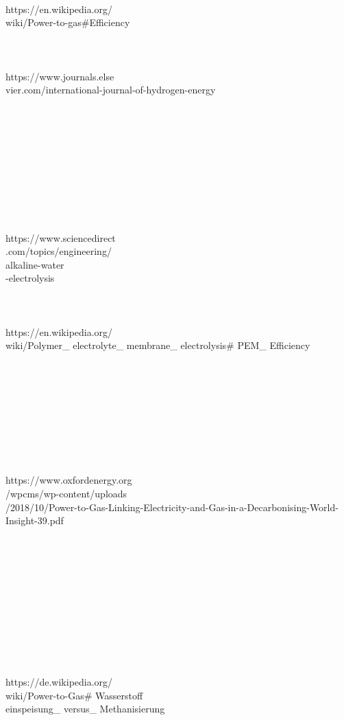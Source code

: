 \begin{parcolumns}[colwidths={1=2.5 cm, 2=10 cm, 3=2.5 cm}]{3}
{\begin{tiny}
\\
https://en.wikipedia.org/\\wiki/Power-to-gas\#Efficiency
\\ \\ \\ \\ 
https://www.journals.else\\vier.com/international-journal-of-hydrogen-energy
\\ \\ \\ \\ \\ \\ \\ \\ \\ \\ \\
https://www.sciencedirect\\.com/topics/engineering/\\alkaline-water\\-electrolysis
\\ \\ \\ \\
https://en.wikipedia.org/\\wiki/Polymer\_ electrolyte\_ membrane\_ electrolysis\# PEM\_ Efficiency
\\ \\ \\ \\ \\ \\ \\ \\ \\ \\
https://www.oxfordenergy.org\\/wpcms/wp-content/uploads\\/2018/10/Power-to-Gas-Linking-Electricity-and-Gas-in-a-Decarbonising-World-Insight-39.pdf
\\ \\ \\ \\ \\ 
\\ \\ \\ \\ \\ \\ \\
https://de.wikipedia.org/\\wiki/Power-to-Gas\# Wasserstoff\\einspeisung\_ versus\_ Methanisierung

\end{tiny}}
\end{parcolumns}
